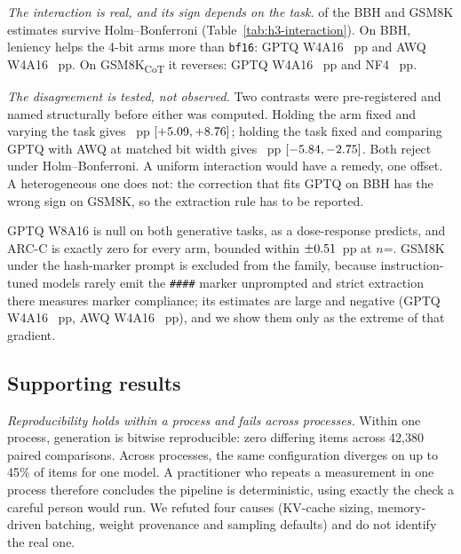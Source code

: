 \documentclass[conference]{IEEEtran}
\begin{document}
\emph{The interaction is real, and its sign depends on the task.} \hThreeExcludesNull{} of
the \hThreeHolmM{} BBH and GSM8K estimates survive Holm--Bonferroni
(Table~\ref{tab:h3-interaction}). On BBH, leniency helps the 4-bit arms more than
\texttt{bf16}: GPTQ W4A16 \hThreeBbhGptqFour{}~pp and AWQ W4A16 \hThreeBbhAwq{}~pp. On
GSM8K\textsubscript{CoT} it reverses: GPTQ W4A16 \hThreeGsmGptqFour{}~pp and NF4
\hThreeGsmNfFour{}~pp.

\emph{The disagreement is tested, not observed.} Two contrasts were pre-registered and named
structurally before either was computed. Holding the arm fixed and varying the task gives
\hThreeHetTasks{}~pp $[+5.09, +8.76]$; holding the task fixed and
comparing GPTQ with AWQ at matched bit width gives \hThreeHetArms{}~pp
$[-5.84, -2.75]$. Both reject under Holm--Bonferroni. A uniform
interaction would have a remedy, one offset. A heterogeneous one does not: the correction that
fits GPTQ on BBH has the wrong sign on GSM8K, so the extraction rule has to be reported.

GPTQ W8A16 is null on both generative tasks, as a dose-response predicts, and ARC-C is exactly
zero for every arm, bounded within $\pm0.51$~pp at $n$=\hThreeArcN. GSM8K under the
hash-marker prompt is excluded from the family, because instruction-tuned models rarely emit
the \texttt{\#\#\#\#} marker unprompted and strict extraction there measures marker
compliance; its estimates are large and negative (GPTQ W4A16 \hThreeGsmDemoGptqFour{}~pp, AWQ
W4A16 \hThreeGsmDemoAwq{}~pp), and we show them only as the extreme of that gradient.

\subsection{Supporting results}
\label{sec:supporting}

\emph{Reproducibility holds within a process and fails across processes.} Within one process,
generation is bitwise reproducible: zero differing items across 42{,}380 paired comparisons.
Across processes, the same configuration diverges on up to 45\% of items for one model. A
practitioner who repeats a measurement in one process therefore concludes the pipeline is
deterministic, using exactly the check a careful person would run. We refuted four causes
(KV-cache sizing, memory-driven batching, weight provenance and sampling defaults) and do not
identify the real one.
\end{document}
